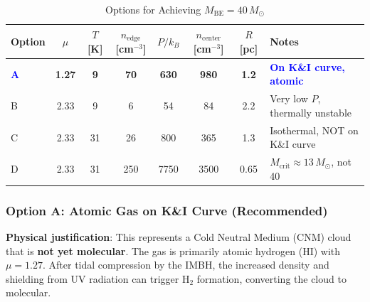 \documentclass[11pt,a4paper]{article}
\newcommand{\Msun}{M_\odot}
\begin{document}
\begin{table}[h]
\centering
\caption{Options for Achieving $M_\mathrm{BE} = 40\,\Msun$}
\label{tab:be_options}
\small
\begin{tabular}{lccccccl}
\toprule
\textbf{Option} & \textbf{$\mu$} & \textbf{$T$ [K]} & \textbf{$n_\mathrm{edge}$ [cm$^{-3}$]} & \textbf{$P/k_B$} & \textbf{$n_\mathrm{center}$ [cm$^{-3}$]} & \textbf{$R$ [pc]} & \textbf{Notes} \\
\midrule
\textcolor{blue}{\textbf{A}} & \textbf{1.27} & \textbf{9} & \textbf{70} & \textbf{630} & \textbf{980} & \textbf{1.2} & \textcolor{blue}{\textbf{On K\&I curve, atomic}} \\
B & 2.33 & 9 & 6 & 54 & 84 & 2.2 & Very low $P$, thermally unstable \\
C & 2.33 & 31 & 26 & 800 & 365 & 1.3 & Isothermal, NOT on K\&I curve \\
D & 2.33 & 31 & 250 & 7750 & 3500 & 0.65 & $M_\mathrm{crit} \approx 13\,\Msun$, not 40 \\
\bottomrule
\end{tabular}
\end{table}

\subsubsection{Option A: Atomic Gas on K\&I Curve (Recommended)}

\textbf{Physical justification}: This represents a Cold Neutral Medium (CNM) cloud that
is \textbf{not yet molecular}. The gas is primarily atomic hydrogen (HI) with $\mu = 1.27$.
After tidal compression by the IMBH, the increased density and shielding from UV radiation
can trigger H$_2$ formation, converting the cloud to molecular.
\end{document}
